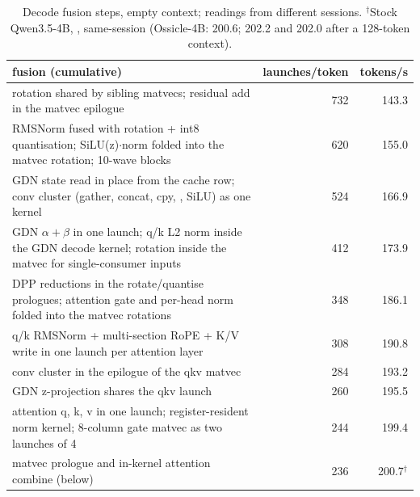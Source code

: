 \documentclass[10.5pt,a4paper]{article}
\newcommand{\tx}[1]{\texttt{\detokenize{#1}}}
\begin{document}
\begin{table}[!ht]
\centering\small
\begin{tabularx}{\linewidth}{@{}>{\raggedright\arraybackslash}Xrr@{}}
\toprule
fusion (cumulative) & launches/token & tokens/s\\
\midrule
rotation shared by sibling matvecs; residual add in the matvec epilogue & 732 & 143.3\\
RMSNorm fused with rotation + int8 quantisation; SiLU(z)$\cdot$norm folded into the \tx{ssm_out} matvec rotation; 10-wave blocks & 620 & 155.0\\
GDN state read in place from the cache row; conv cluster (gather, concat, cpy, \tx{ssm_conv}, SiLU) as one kernel & 524 & 166.9\\
GDN $\alpha{+}\beta$ in one launch; q/k L2 norm inside the GDN decode kernel; rotation inside the matvec for single-consumer inputs & 412 & 173.9\\
DPP reductions in the rotate/quantise prologues; attention gate and per-head norm folded into the matvec rotations & 348 & 186.1\\
q/k RMSNorm + multi-section RoPE + K/V write in one launch per attention layer & 308 & 190.8\\
conv cluster in the epilogue of the qkv matvec & 284 & 193.2\\
GDN z-projection shares the qkv launch & 260 & 195.5\\
attention q, k, v in one launch; register-resident norm kernel; 8-column gate matvec as two launches of 4 & 244 & 199.4\\
matvec prologue and in-kernel attention combine (below) & 236 & 200.7$^{\dagger}$\\
\bottomrule
\end{tabularx}
\caption{Decode fusion steps, empty context; readings from different sessions. $^{\dagger}$Stock Qwen3.5-4B, \tx{quality}, same-session (Ossicle-4B: 200.6; 202.2 and 202.0 after a 128-token context).}
\end{table}
\end{document}
